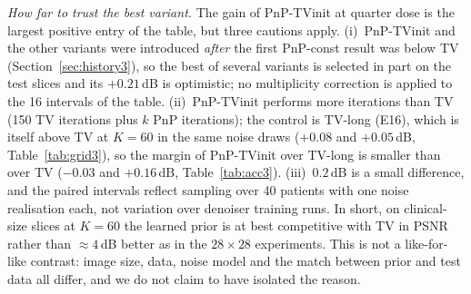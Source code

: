 \emph{How far to trust the best variant.} The gain of PnP-TVinit at quarter dose is the largest positive entry of the table, but three cautions apply. (i)~PnP-TVinit and the other variants were introduced \emph{after} the first PnP-const result was below TV (Section~\ref{sec:history3}), so the best of several variants is
selected in part on the test slices and its $+0.21$\,dB is optimistic; no multiplicity correction is applied to the 16 intervals of the table. (ii)~PnP-TVinit performs more iterations than TV (150 TV iterations plus $k$ PnP iterations); the control is TV-long (E16), which is itself above TV at $K=60$ in the same noise draws ($+0.08$ and $+0.05$\,dB, Table~\ref{tab:grid3}), so the margin of PnP-TVinit over TV-long is smaller than over TV ($-0.03$ and $+0.16$\,dB, Table~\ref{tab:acc3}). (iii)~$0.2$\,dB is a small difference, and the paired intervals reflect sampling over 40 patients with one noise realisation each, not variation over denoiser training runs.
In short, on clinical-size slices at $K=60$ the learned prior is at best competitive with TV in PSNR rather than $\approx4$\,dB better as in the $28\times28$ experiments. This is not a like-for-like contrast: image size, data, noise model and the match between prior and test data all differ, and we do not claim to have isolated the reason.

